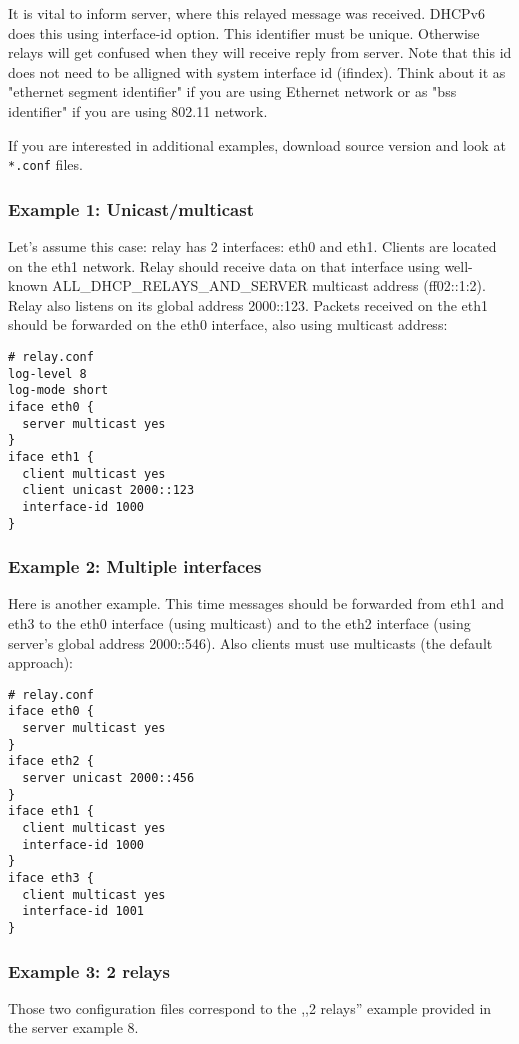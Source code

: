 It is vital to inform server, where this relayed message was
received. DHCPv6 does this using interface-id option. This identifier
must be unique. Otherwise relays will get confused when they will
receive reply from server. Note that this id does not need to be
alligned with system interface id (ifindex). Think about it as
"ethernet segment identifier" if you are using Ethernet network or as
"bss identifier" if you are using 802.11 network.

If you are interested in additional examples, download source version
and look at \verb+*.conf+ files.

\subsubsection{Example 1: Unicast/multicast}
Let's assume this case: relay has 2 interfaces: eth0 and
eth1. Clients are located on the eth1 network. Relay should receive
data on that interface using well-known ALL\_DHCP\_RELAYS\_AND\_SERVER
multicast address (ff02::1:2). Relay also listens on its global
address 2000::123. Packets received on the eth1 should be forwarded on
the eth0 interface, also using multicast address:

\begin{verbatim}
# relay.conf
log-level 8
log-mode short
iface eth0 {
  server multicast yes
}
iface eth1 {
  client multicast yes
  client unicast 2000::123
  interface-id 1000
}
\end{verbatim}

\subsubsection{Example 2: Multiple interfaces}
Here is another example. This time messages should be forwarded from
eth1 and eth3 to the eth0 interface (using multicast) and to the eth2
interface (using server's global address 2000::546). Also clients must
use multicasts (the default approach):

\begin{verbatim}
# relay.conf
iface eth0 {
  server multicast yes
}
iface eth2 {
  server unicast 2000::456
}
iface eth1 {
  client multicast yes                    
  interface-id 1000
}
iface eth3 {
  client multicast yes                    
  interface-id 1001
}
\end{verbatim}

\subsubsection{Example 3: 2 relays}
Those two configuration files correspond to the ,,2 relays'' example
provided in the server example 8.

